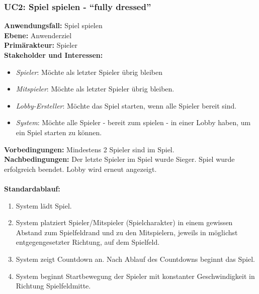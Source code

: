 \documentclass[11pt,ngerman]{article}
\newcommand{\quotes}[1]{``#1''}
\begin{document}
    \subsubsection{UC2: Spiel spielen - \quotes{fully dressed}}
    \label{ssec:UC2Spielspielen}
    \begin{tcolorbox}[enhanced, breakable, sharp corners, width=\dimexpr\textwidth-15mm\relax ,enlarge left by=10mm ,fontupper=\linespread{1.1}\selectfont, boxrule=1pt, title={UC2: Spiel spielen}, colback=white, colframe=gray!22, coltitle=black]

    	\textbf{Anwendungsfall:} Spiel spielen \\
    	\textbf{Ebene:} Anwenderziel \\
    	\textbf{Primärakteur:} Spieler \\
    	\textbf{Stakeholder und Interessen:}
    	\begin{itemize}
    		\item \textit{Spieler}: Möchte als letzter Spieler übrig bleiben
    		\item \textit{Mitspieler}: Möchte als letzter Spieler übrig bleiben.
    		\item \textit{Lobby-Ersteller}:  Möchte das Spiel starten, wenn alle Spieler bereit sind.
    		\item \textit{System}: Möchte alle Spieler - bereit zum spielen - in einer \Gls{Lobby} haben, um ein Spiel starten zu können.
    	\end{itemize}
    	\textbf{Vorbedingungen:} Mindestens 2 Spieler sind im Spiel.\\
    	\textbf{Nachbedingungen:} Der letzte Spieler im Spiel wurde Sieger. Spiel wurde erfolgreich beendet. \Gls{Lobby} wird erneut angezeigt. \\
    	\\  \textbf{Standardablauf:}
    	\begin{enumerate}
    		\item System lädt Spiel.
    		\item System platziert Spieler/Mitspieler (Spielcharakter) in einem gewissen Abstand zum Spielfeldrand und zu den Mitspielern, jeweils in möglichst entgegengesetzter Richtung, auf dem Spielfeld.
    		\item System zeigt Countdown an. Nach Ablauf des Countdowns beginnt das Spiel.
    		\item System beginnt Startbewegung der Spieler mit konstanter Geschwindigkeit in Richtung Spielfeldmitte.
    	\end{enumerate}

\end{tcolorbox}
\end{document}
